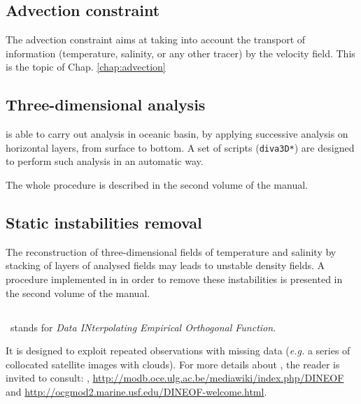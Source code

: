  
\subsection{Advection constraint}


The advection constraint aims at taking into account the transport of information (temperature, salinity, or any other tracer) by the velocity field. 
This is the topic of Chap. \ref{chap:advection}


\subsection{Three-dimensional analysis}

\diva is able to carry out analysis in oceanic basin, by applying successive analysis on horizontal layers, from surface to bottom. A set of scripts (\texttt{diva3D*}) are designed to perform such analysis in an automatic way.

The whole procedure is described in the second volume of the manual.

\subsection{Static instabilities removal}

The reconstruction of three-dimensional fields of temperature and salinity by stacking of layers of analysed fields may leads to unstable density fields. A procedure implemented in \diva in order to remove these instabilities is presented in the second volume of the manual.

\subsection{\dineof\label{lasttool}}

\hypertarget{DINEOF}{\dineof}\, stands for \textit{Data INterpolating Empirical Orthogonal Function}.

It is designed to exploit repeated observations with missing data (\textit{e.g.} a series of collocated satellite images with clouds).
For more details about \dineof, the reader is invited to consult:
\cite{ALVERA05,ALVERA07,BECKERS03,BECKERS06}, \url{http://modb.oce.ulg.ac.be/mediawiki/index.php/DINEOF} and   \url{http://ocgmod2.marine.usf.edu/DINEOF-welcome.html}.



